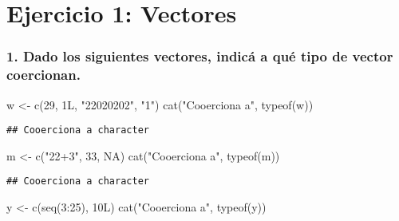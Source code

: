 \documentclass[
]{article}
\newenvironment{Shaded}{\begin{snugshade}}{\end{snugshade}}
\newcommand{\ConstantTok}[1]{\textcolor[rgb]{0.00,0.00,0.00}{#1}}
\newcommand{\DecValTok}[1]{\textcolor[rgb]{0.00,0.00,0.81}{#1}}
\newcommand{\FunctionTok}[1]{\textcolor[rgb]{0.00,0.00,0.00}{#1}}
\newcommand{\NormalTok}[1]{#1}
\newcommand{\OtherTok}[1]{\textcolor[rgb]{0.56,0.35,0.01}{#1}}
\newcommand{\SpecialCharTok}[1]{\textcolor[rgb]{0.00,0.00,0.00}{#1}}
\newcommand{\StringTok}[1]{\textcolor[rgb]{0.31,0.60,0.02}{#1}}
\begin{document}
\newcommand{\bs}[1]{\boldsymbol{#1}}
\newcommand{\E}{\bs{\mathcal{E}}}
\newcommand{\F}{\bs{\mathcal{F}}}
\renewcommand{\v}{\bs{v}}
\renewcommand{\bfdefault}{m}

\newpage

\hypertarget{ejercicio-1-vectores}{%
\section{Ejercicio 1: Vectores}\label{ejercicio-1-vectores}}

\hypertarget{dado-los-siguientes-vectores-indicuxe1-a-quuxe9-tipo-de-vector-coercionan.}{%
\subsubsection{1. Dado los siguientes vectores, indicá a qué tipo de
vector
coercionan.}\label{dado-los-siguientes-vectores-indicuxe1-a-quuxe9-tipo-de-vector-coercionan.}}

\begin{Shaded}
\begin{Highlighting}[]
\NormalTok{w }\OtherTok{\textless{}{-}} \FunctionTok{c}\NormalTok{(}\DecValTok{29}\NormalTok{, 1L, }\StringTok{"22020202"}\NormalTok{, }\StringTok{"1"}\NormalTok{)}
\FunctionTok{cat}\NormalTok{(}\StringTok{"Cooerciona a"}\NormalTok{, }\FunctionTok{typeof}\NormalTok{(w))}
\end{Highlighting}
\end{Shaded}

\begin{verbatim}
## Cooerciona a character
\end{verbatim}

\begin{Shaded}
\begin{Highlighting}[]
\NormalTok{m }\OtherTok{\textless{}{-}} \FunctionTok{c}\NormalTok{(}\StringTok{"22+3"}\NormalTok{, }\DecValTok{33}\NormalTok{, }\ConstantTok{NA}\NormalTok{)}
\FunctionTok{cat}\NormalTok{(}\StringTok{"Cooerciona a"}\NormalTok{, }\FunctionTok{typeof}\NormalTok{(m))}
\end{Highlighting}
\end{Shaded}

\begin{verbatim}
## Cooerciona a character
\end{verbatim}

\begin{Shaded}
\begin{Highlighting}[]
\NormalTok{y }\OtherTok{\textless{}{-}} \FunctionTok{c}\NormalTok{(}\FunctionTok{seq}\NormalTok{(}\DecValTok{3}\SpecialCharTok{:}\DecValTok{25}\NormalTok{), 10L)}
\FunctionTok{cat}\NormalTok{(}\StringTok{"Cooerciona a"}\NormalTok{, }\FunctionTok{typeof}\NormalTok{(y))}
\end{Highlighting}
\end{Shaded}
\end{document}
